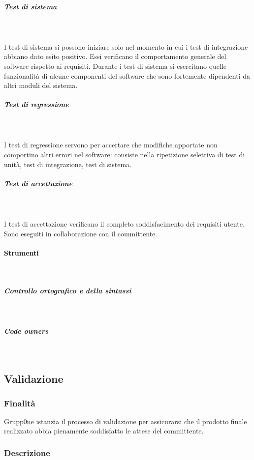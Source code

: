 \documentclass[../norme-di-progetto.tex]{subfiles}
\begin{document}
\subparagraph{Test di sistema}\mbox{}\\
\label{test di sistemaa}
\\ I test di sistema si possono iniziare solo nel momento in cui i test di integrazione abbiano dato esito positivo. Essi verificano il comportamento generale del software rispetto ai requisiti. Durante i test di sistema si esercitano quelle funzionalità di alcune componenti del software che sono fortemente dipendenti da altri moduli del sistema.
\subparagraph{Test di regressione}\mbox{}\\
\label{test di regressione}
\\I test di regressione servono per accertare che modifiche apportate non comportino altri errori nel software: consiste nella ripetizione selettiva di test di unità, test di integrazione, test di sistema.
\subparagraph{Test di accettazione}\mbox{}\\
\label{test di accettazione}
\\I test di accettazione verificano il completo soddisfacimento dei requisiti utente. Sono eseguiti in collaborazione con il committente.
\paragraph{Strumenti}\mbox{}\\
\label{par:strumenti}
\subparagraph{Controllo ortografico e della sintassi}\mbox{}\\
\label{subp:controllo ortografico e della sintassi}
\subparagraph{Code owners}\mbox{}\\
\label{subp:code owners}

\subsection{Validazione}%
\label{sub:validazione}

\subsubsection{Finalità}%
\label{subs:finalità}

Grupp0ne istanzia il processo di validazione per assicurarsi che il prodotto finale realizzato abbia pienamente soddisfatto le attese del committente.

\subsubsection{Descrizione}%
\label{subs:descrizione}
\end{document}
